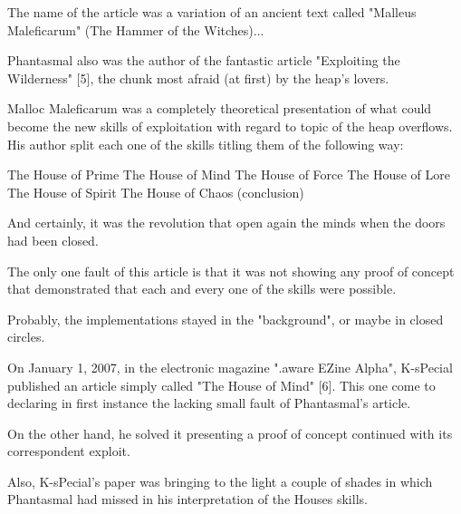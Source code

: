 \documentclass[12pt]{article}
\begin{document}
The name of the article was a variation of an ancient text 
 called "Malleus Maleficarum" (The Hammer of the Witches)...
\newline

Phantasmal also was the author of the fantastic article "Exploiting the 
Wilderness" [5], the chunk most afraid (at first) by the heap's lovers.
\newline

Malloc Maleficarum was a completely theoretical presentation of what could
become the new skills of exploitation with regard to topic of the heap
overflows. His author split each one of the skills titling them of the
following way:\newline

   The House of Prime\newline
   The House of Mind \newline
   The House of Force \newline
   The House of Lore \newline
   The House of Spirit \newline
   The House of Chaos (conclusion) \newline
   
And certainly, it was the revolution that open again the minds when the
doors had been closed.
\newline

The only one fault of this article is that it was not showing any
proof of concept that demonstrated that each and every one of the
skills were possible.
\newline

Probably, the implementations stayed in the "background", or maybe in
closed circles.
\newline

On January 1, 2007, in the electronic magazine ".aware EZine Alpha",
K-sPecial published an article simply called "The House of Mind" [6].
This one come to declaring in first instance the lacking small
fault of Phantasmal's article. 
\newline

On the other hand, he solved it presenting a proof of concept continued 
with its correspondent exploit.
\newline

Also, K-sPecial's paper was bringing to the light a couple of shades in 
which Phantasmal had missed in his interpretation of the Houses skills.
\newline
\end{document}
